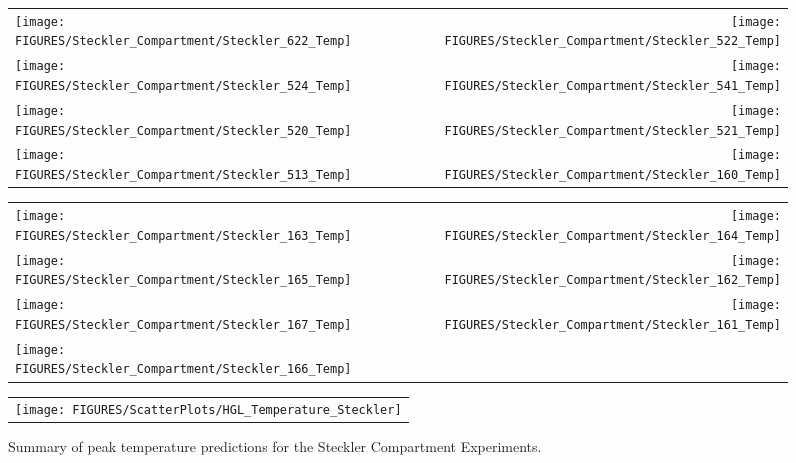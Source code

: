 \begin{figure}[p]
\begin{tabular*}{\textwidth}{l@{\extracolsep{\fill}}r}
\texttt{[image: FIGURES/Steckler\_Compartment/Steckler\_622\_Temp]} &
\texttt{[image: FIGURES/Steckler\_Compartment/Steckler\_522\_Temp]} \\
\texttt{[image: FIGURES/Steckler\_Compartment/Steckler\_524\_Temp]} &
\texttt{[image: FIGURES/Steckler\_Compartment/Steckler\_541\_Temp]} \\
\texttt{[image: FIGURES/Steckler\_Compartment/Steckler\_520\_Temp]} &
\texttt{[image: FIGURES/Steckler\_Compartment/Steckler\_521\_Temp]} \\
\texttt{[image: FIGURES/Steckler\_Compartment/Steckler\_513\_Temp]} &
\texttt{[image: FIGURES/Steckler\_Compartment/Steckler\_160\_Temp]}
\end{tabular*}
\label{Steckler_Temp_6}
\end{figure}

\begin{figure}[p]
\begin{tabular*}{\textwidth}{l@{\extracolsep{\fill}}r}
\texttt{[image: FIGURES/Steckler\_Compartment/Steckler\_163\_Temp]} &
\texttt{[image: FIGURES/Steckler\_Compartment/Steckler\_164\_Temp]} \\
\texttt{[image: FIGURES/Steckler\_Compartment/Steckler\_165\_Temp]} &
\texttt{[image: FIGURES/Steckler\_Compartment/Steckler\_162\_Temp]} \\
\texttt{[image: FIGURES/Steckler\_Compartment/Steckler\_167\_Temp]} &
\texttt{[image: FIGURES/Steckler\_Compartment/Steckler\_161\_Temp]} \\
\texttt{[image: FIGURES/Steckler\_Compartment/Steckler\_166\_Temp]} &

\end{tabular*}
\label{Steckler_Temp_7}
\end{figure}

\begin{figure}[p]
\begin{center}
\begin{tabular}{l}
\texttt{[image: FIGURES/ScatterPlots/HGL\_Temperature\_Steckler]}
\end{tabular}
\caption{Summary of peak temperature predictions for the Steckler Compartment Experiments.}
\end{center}
\end{figure}
